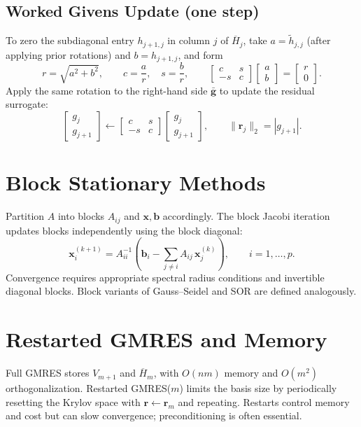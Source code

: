 \subsection*{Worked Givens Update (one step)}
To zero the subdiagonal entry $h_{j+1,j}$ in column $j$ of $\overline H_j$, take $a=\tilde h_{j,j}$ (after applying prior rotations) and $b=h_{j+1,j}$, and form
\[
  r=\sqrt{a^2+b^2},\qquad c=\frac{a}{r},\quad s=\frac{b}{r},\qquad \begin{bmatrix}c&s\\-s&c\end{bmatrix}\begin{bmatrix}a\\ b\end{bmatrix}=\begin{bmatrix}r\\ 0\end{bmatrix}.
\]
Apply the same rotation to the right-hand side $\bar{\mathbf g}$ to update the residual surrogate:
\[
  \begin{bmatrix}g_j\\ g_{j+1}\end{bmatrix} \leftarrow \begin{bmatrix}c&s\\-s&c\end{bmatrix} \begin{bmatrix}g_j\\ g_{j+1}\end{bmatrix},\qquad \|\mathbf r_j\|_2=|g_{j+1}|.
\]

\section{Block Stationary Methods}
Partition $A$ into blocks $A_{ij}$ and $\mathbf{x},\mathbf{b}$ accordingly. The block Jacobi iteration updates blocks independently using the block diagonal:
\[
  \mathbf{x}_i^{(k+1)} = A_{ii}^{-1}\left(\mathbf{b}_i - \sum_{j\ne i} A_{ij}\,\mathbf{x}_j^{(k)}\right),\qquad i=1,\dots,p.
\]
Convergence requires appropriate spectral radius conditions and invertible diagonal blocks. Block variants of Gauss–Seidel and SOR are defined analogously.

\section{Restarted GMRES and Memory}
Full GMRES stores $V_{m+1}$ and $\overline H_m$, with $O(nm)$ memory and $O(m^2)$ orthogonalization. Restarted GMRES($m$) limits the basis size by periodically resetting the Krylov space with $\mathbf{r}\leftarrow\mathbf{r}_m$ and repeating. Restarts control memory and cost but can slow convergence; preconditioning is often essential.
